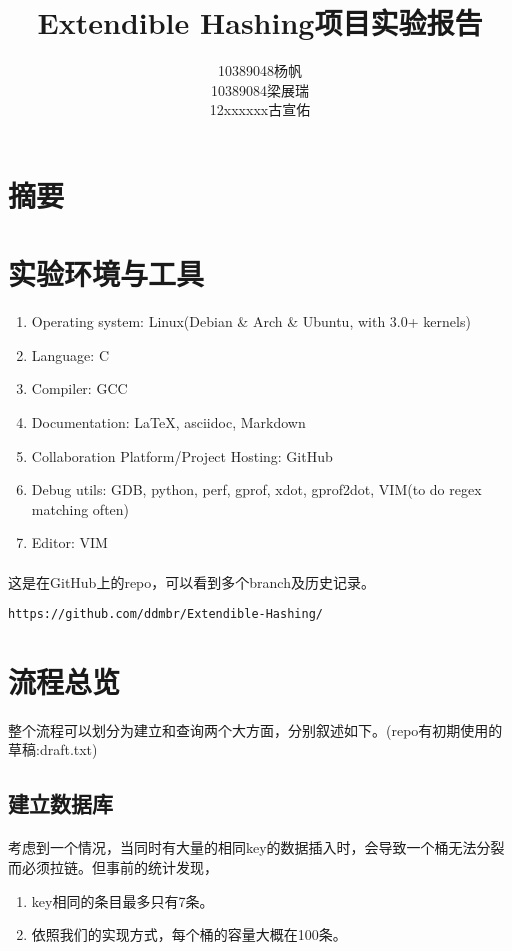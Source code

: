 \documentclass{article}
\title{Extendible Hashing项目实验报告}
\author{10389048杨帆 \\ 10389084梁展瑞 \\ 12xxxxxx古宣佑}
\begin{document}
\maketitle
\section{摘要}
\section{实验环境与工具}
    \begin{enumerate}
        \item Operating system: Linux(Debian \& Arch \& Ubuntu, with 3.0+ kernels)
        \item Language: C
        \item Compiler: GCC
        \item Documentation: \LaTeX , asciidoc, Markdown
        \item Collaboration Platform/Project Hosting: GitHub
        \item Debug utils: GDB, python, perf, gprof, xdot, gprof2dot, VIM(to do regex matching often)
        \item Editor: VIM
    \end{enumerate}
    \paragraph{}
        这是在GitHub上的repo，可以看到多个branch及历史记录。
    \begin{verbatim}
https://github.com/ddmbr/Extendible-Hashing/
    \end{verbatim}
\section{流程总览}
    \paragraph{}
        整个流程可以划分为建立和查询两个大方面，分别叙述如下。(repo有初期使用的草稿:draft.txt)
    \subsection{建立数据库}
        \paragraph{}
            考虑到一个情况，当同时有大量的相同key的数据插入时，会导致一个桶无法分裂而必须拉链。但事前的统计发现，
        \begin{enumerate}
            \item key相同的条目最多只有7条。
            \item 依照我们的实现方式，每个桶的容量大概在100条。
        \end{enumerate}
\end{document}
